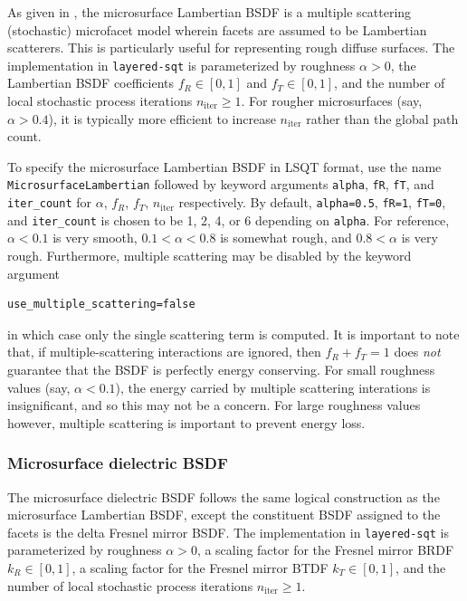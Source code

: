 \documentclass[
    twoside,
    twocolumn,
    letterpaper,
    10pt]{article}
\newcommand\namett[2]{{\color{code#1}\texttt{#2}}}
\begin{document}
As given in \cite{Heitz:16},
the microsurface Lambertian BSDF is a multiple scattering (stochastic)
microfacet model wherein facets are assumed to be Lambertian scatterers. 
This is particularly useful for representing rough diffuse surfaces. The 
implementation in \texttt{layered-sqt} is parameterized by
roughness $\alpha>0$, the Lambertian BSDF coefficients
$f_R \in [0,1]$ and $f_T \in [0,1]$, and the number of 
local stochastic process 
iterations $n_{\text{iter}} \ge 1$. For rougher microsurfaces 
(say, $\alpha > 0.4$), it is typically more efficient to increase 
$n_{\text{iter}}$ rather than the global path count.

To specify the microsurface Lambertian BSDF 
in LSQT format, use the name 
\namett{purple}{MicrosurfaceLambertian}
followed by keyword arguments 
\texttt{alpha}, \texttt{fR}, \texttt{fT}, and \texttt{iter\_count} for 
$\alpha$, $f_R$, $f_T$, $n_{\text{iter}}$ respectively. By default, 
\texttt{alpha=0.5}, \texttt{fR=1}, \texttt{fT=0}, and \texttt{iter\_count} 
is chosen to be 1, 2, 4, or 6 depending on \texttt{alpha}. For reference, 
$\alpha < 0.1$ is very smooth, 
$0.1 < \alpha < 0.8$ is somewhat rough, and $0.8 < \alpha$ is very rough.
Furthermore, multiple scattering may be disabled by the keyword argument
\begin{lstlisting}
use_multiple_scattering=false
\end{lstlisting}
in which case only the single scattering term is computed. It is 
important to note that, if multiple-scattering interactions are 
ignored, then $f_R + f_T = 1$ does \emph{not} guarantee that the BSDF 
is perfectly energy conserving. 
For small roughness values (say, $\alpha < 0.1$), the energy carried by 
multiple scattering interations is insignificant, and so this may not be a
concern. For large roughness values however, multiple scattering is important
to prevent energy loss.

\subsubsection{Microsurface dielectric BSDF}
\label{sec:doc-layers-microsurface-dielectric}

The microsurface dielectric BSDF follows the same logical construction as 
the microsurface Lambertian BSDF, except the constituent BSDF assigned to the
facets is the delta Fresnel mirror BSDF. The implementation in 
\texttt{layered-sqt} is parameterized by roughness $\alpha > 0$, a scaling
factor for the Fresnel mirror BRDF $k_R \in [0, 1]$, a scaling factor for 
the Fresnel mirror BTDF $k_T \in [0, 1]$, and the number of local stochastic 
process iterations $n_{\text{iter}} \ge 1$.
\end{document}

